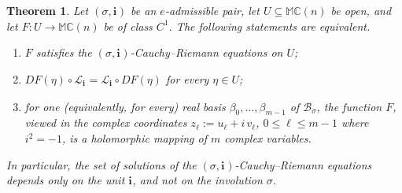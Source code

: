 \documentclass[12pt]{amsart}
\theoremstyle{plain}
\newtheorem{theorem}{Theorem}[section]
\theoremstyle{definition}
\numberwithin{equation}{section}
\newcommand{\im}[1]{\mathbf{ i_{#1}}}
\newcommand{\mC}{\mathbb{C}}
\newcommand{\mM}{\mathbb{M}}
\newcommand{\cL}{\mathcal{L}}
\newcommand{\cB}{\mathcal{B}}
\newcommand{\ra}{\rightarrow}
\begin{document}
    \begin{theorem}\label{T:SigmaIndependence}
    Let $(\sigma , \im{})$ be an $e$-admissible pair, let $U \subseteq \mM \mC(n)$ be open, and let $F : U \ra \mM \mC(n)$ be of class $C^1$. The following statements are equivalent.
        \begin{enumerate}[label=(\roman*)]
        \item $F$ satisfies the $(\sigma , \im{})$-Cauchy--Riemann equations on $U$;
        \item $DF (\eta ) \circ \cL_{\im{}} = \cL_{\im{}} \circ D F (\eta)$ for every $\eta \in U$;
        \item for one (equivalently, for every) real basis $\beta_0 , \ldots , \beta_{m-1}$ of $\cB_\sigma$, the function $F$, viewed in the complex coordinates $z_\ell := u_\ell + i\, v_\ell$, $0 \leq \ell \leq m - 1$ where $i^2 = -1$, is a holomorphic mapping of $m$ complex variables.
        \end{enumerate}
    In particular, the set of solutions of the $(\sigma , \im{})$-Cauchy--Riemann equations depends only on the unit $\im{}$, and not on the involution $\sigma$.
    \end{theorem}
\end{document}
